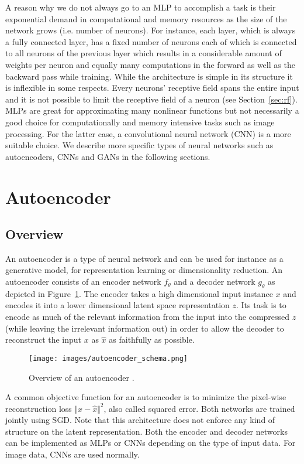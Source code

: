 \documentclass[a4paper,12pt]{report}
\begin{document}
A reason why we do not always go to an MLP to accomplish a task is their exponential demand in computational and memory resources as the size of the network grows (i.e. number of neurons). For instance, each layer, which is always a fully connected layer, has a fixed number of neurons each of which is connected to all neurons of the previous layer which results in a considerable amount of weights per neuron and equally many computations in the forward as well as the backward pass while training. While the architecture is simple in its structure it is inflexible in some respects. Every neurons' receptive field spans the entire input and it is not possible to limit the receptive field of a neuron (see Section~\ref{sec:rf}). MLPs are great for approximating many nonlinear functions but not necessarily a good choice for computationally and memory intensive tasks such as image processing. For the latter case, a convolutional neural network (CNN) is a more suitable choice. We describe more specific types of neural networks such as autoencoders, CNNs and GANs in the following sections.

\section{Autoencoder}
\subsection{Overview}
An autoencoder is a type of neural network and can be used for instance as a generative model, for representation learning or dimensionality reduction. An autoencoder consists of an encoder network $f_{\theta}$ and a decoder network  $g_{\theta}$ as depicted in Figure~\ref{fig:autoencoder}. The encoder takes a high dimensional input instance $x$ and encodes it into a lower dimensional latent space representation $z$. Its task is to encode as much of the relevant information from the input into the compressed $z$ (while leaving the irrelevant information out) in order to allow the decoder to reconstruct the input $x$ as $\hat{x}$ as faithfully as possible.
\begin{figure}[ht]
\centering
\texttt{[image: images/autoencoder\_schema.png]}
\caption{Overview of an autoencoder \cite{chollet_autoencoders}.}
\label{fig:autoencoder}
\end{figure}
A common objective function for an autoencoder is to minimize the pixel-wise reconstruction loss $\Vert x - \hat{x} \Vert^2$, also called squared error. Both networks are trained jointly using SGD. Note that this architecture does not enforce any kind of structure on the latent representation. Both the encoder and decoder networks can be implemented as MLPs or CNNs depending on the type of input data. For image data, CNNs are used normally.
\end{document}
